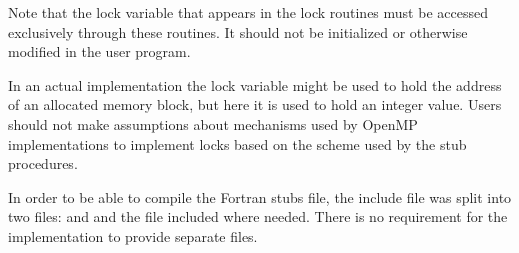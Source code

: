 Note that the lock variable that appears in the lock routines must be accessed
exclusively through these routines. It should not be initialized or otherwise modified in
the user program.

In an actual implementation the lock variable might be used to hold the address of an
allocated memory block, but here it is used to hold an integer value. Users should not
make assumptions about mechanisms used by OpenMP implementations to implement
locks based on the scheme used by the stub procedures.

\begin{fortranspecific}

In order to be able to compile the Fortran stubs file, the include file
 was split into two files:  and  and the
 file included where needed. There is no requirement for the
implementation to provide separate files.

\end{fortranspecific}


\pagebreak



